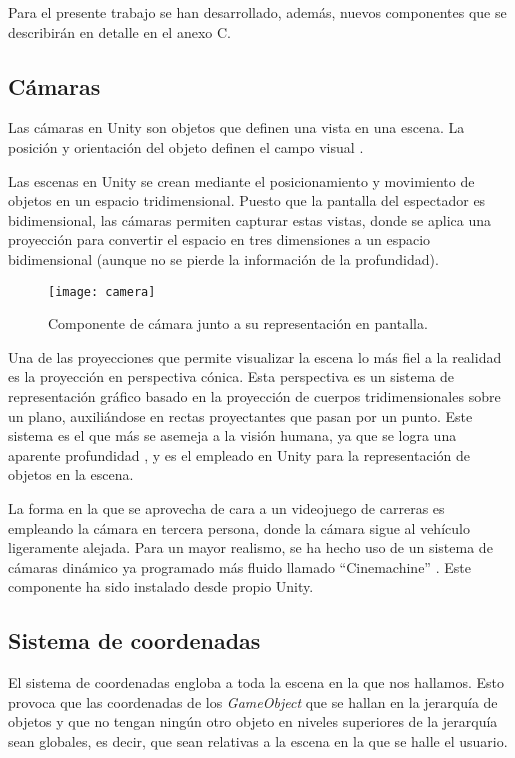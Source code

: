 Para el presente trabajo se han desarrollado, además, nuevos componentes que se describirán en detalle en el anexo C.

\subsection{Cámaras}

Las cámaras en Unity son objetos que definen una vista en una escena. La posición y orientación del objeto definen el campo visual \cite{doc:cameras}.

Las escenas en Unity se crean mediante el posicionamiento y movimiento de objetos en un espacio tridimensional. Puesto que la pantalla del espectador es bidimensional, las cámaras permiten capturar estas vistas, donde se aplica una proyección para convertir el espacio en tres dimensiones a un espacio bidimensional (aunque no se pierde la información de la profundidad).

\begin{figure}[h]
	\centering
	\texttt{[image: camera]}
	\caption{Componente de cámara junto a su representación en pantalla.}
	\label{fig:camera}
\end{figure}

Una de las proyecciones que permite visualizar la escena lo más fiel a la realidad es la proyección en perspectiva cónica. Esta perspectiva es un sistema de representación gráfico basado en la proyección de cuerpos tridimensionales sobre un plano, auxiliándose en rectas proyectantes que pasan por un punto. Este sistema es el que más se asemeja a la visión humana, ya que se logra una aparente profundidad \cite{eduxg:perscon}, y es el empleado en Unity para la representación de objetos en la escena.

La forma en la que se aprovecha de cara a un videojuego de carreras es empleando la cámara en tercera persona, donde la cámara sigue al vehículo ligeramente alejada. Para un mayor realismo, se ha hecho uso de un sistema de cámaras dinámico ya programado más fluido llamado ``Cinemachine'' \cite{doc:cinemachine}. Este componente ha sido instalado desde propio Unity.

\subsection{Sistema de coordenadas}

El sistema de coordenadas engloba a toda la escena en la que nos hallamos. Esto provoca que las coordenadas de los \textit{GameObject} que se hallan en la jerarquía de objetos y que no tengan ningún otro objeto en niveles superiores de la jerarquía sean globales, es decir, que sean relativas a la escena en la que se halle el usuario. 

